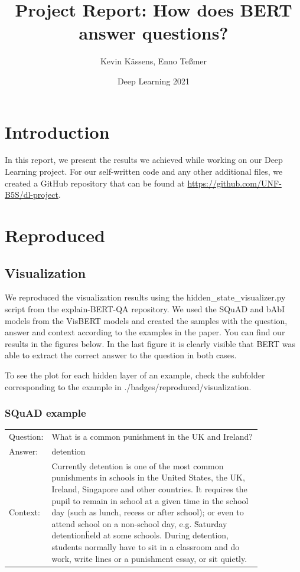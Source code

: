 \documentclass{article}
\title{Project Report: How does BERT answer questions?}
\author{Kevin Kässens, Enno Teßmer}
\date{Deep Learning 2021}
\begin{document}
	\maketitle
	\section{Introduction}
	In this report, we present the results we achieved while working on our Deep Learning project. For our self-written code and any other additional files, we created a GitHub repository that can be found at \url{https://github.com/UNF-B5S/dl-project}.
	
	\section{Reproduced}
	\subsection{Visualization}
	We reproduced the visualization results using the hidden\_state\_visualizer.py script from the explain-BERT-QA repository. We used the SQuAD and bAbI models from the VisBERT models and created the samples with the question, answer and context according to the examples in the paper.
	You can find our results in the figures below. In the last figure it is clearly visible that BERT was able to extract the correct answer to the question in both cases.
	
	To see the plot for each hidden layer of an example, check the subfolder corresponding to the example in ./badges/reproduced/visualization.
	
	\subsubsection{SQuAD example}
	
	\begin{tabular}{ l p{0.85\linewidth} }
		Question: & What is a common punishment in the UK and Ireland? \\
		Answer: & detention \\
		Context: & Currently detention is one of the most common punishments in schools in the United States, the UK, Ireland, Singapore and other countries. It requires the pupil to remain in school at a given time in the school day (such as lunch, recess or after school); or even to attend school on a non-school day, e.g. \"Saturday detention\" held at some schools. During detention, students normally have to sit in a classroom and do work, write lines or a punishment essay, or sit quietly. \\
	\end{tabular}
	
\end{document}
